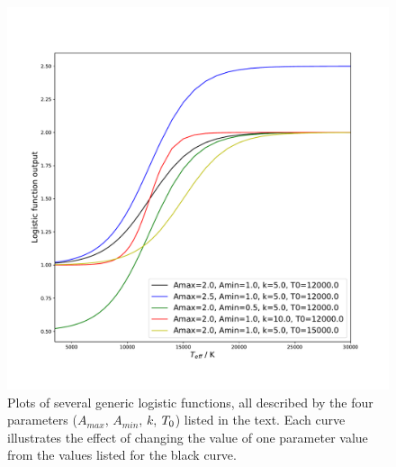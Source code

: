 \documentclass[12pt, a4paper]{report}
\begin{document}
\begin{figure}[h!]
\begin{center}
\includegraphics[width=1.0\textwidth]{generic_logistic_params_illustration.pdf}
\caption{Plots of several generic logistic functions, all described by the four parameters ($A_{max}$, $A_{min}$, $k$, $T_{\textnormal{0}}$) listed in the text. Each curve illustrates the effect of changing the value of one parameter value from the values listed for the black curve.}
\label{logistic_curve}
\end{center}
\end{figure}
\end{document}
